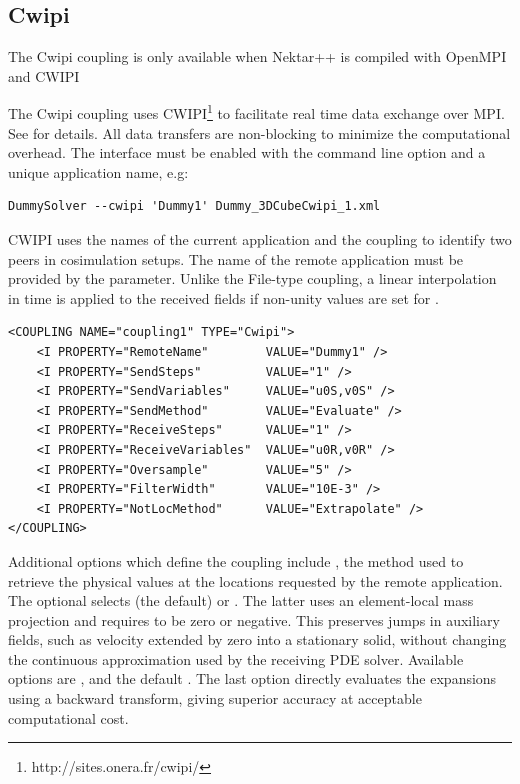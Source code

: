\subsection{Cwipi}

\begin{notebox}
    The Cwipi coupling is only available when Nektar++ is compiled with OpenMPI and CWIPI
\end{notebox}
The Cwipi coupling uses CWIPI\footnote{http://sites.onera.fr/cwipi/} to facilitate real time data exchange over MPI.
See \cite{La18} for details.
All data transfers are non-blocking to minimize the computational overhead.
The interface must be enabled with the command line option  and a unique application name, e.g:\begin{lstlisting}[style=BashInputStyle] 
DummySolver --cwipi 'Dummy1' Dummy_3DCubeCwipi_1.xml
\end{lstlisting}
CWIPI uses the names of the current application and the coupling to identify two peers in cosimulation setups.
The name of the remote application must be provided by the  parameter.
Unlike the File-type coupling, a linear interpolation in time is applied to the received fields if non-unity values are set for .
\begin{lstlisting}[style=XMLStyle] 
<COUPLING NAME="coupling1" TYPE="Cwipi">
    <I PROPERTY="RemoteName"        VALUE="Dummy1" />
    <I PROPERTY="SendSteps"         VALUE="1" />
    <I PROPERTY="SendVariables"     VALUE="u0S,v0S" />
    <I PROPERTY="SendMethod"        VALUE="Evaluate" />
    <I PROPERTY="ReceiveSteps"      VALUE="1" />
    <I PROPERTY="ReceiveVariables"  VALUE="u0R,v0R" />
    <I PROPERTY="Oversample"        VALUE="5" />
    <I PROPERTY="FilterWidth"       VALUE="10E-3" />
    <I PROPERTY="NotLocMethod"      VALUE="Extrapolate" />
</COUPLING>
\end{lstlisting}

Additional options which define the coupling include , the method used to retrieve the physical values at the locations requested by the remote application.
The optional  selects  (the default)
or . The latter uses an element-local mass projection and requires
 to be zero or negative. This preserves jumps in auxiliary
fields, such as velocity extended by zero into a stationary solid, without
changing the continuous approximation used by the receiving PDE solver.
Available options are ,  and the default .
The last option directly evaluates the expansions using a backward transform, giving superior accuracy at acceptable computational cost.

